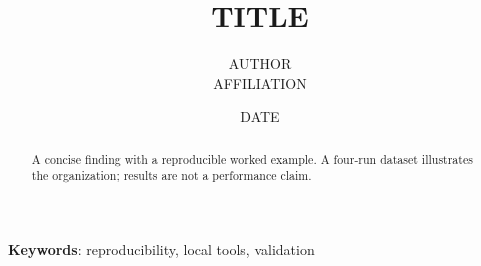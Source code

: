 \documentclass{article}
\title{{{TITLE}}}
\author{{{AUTHOR}} \\ {{AFFILIATION}}}
\date{{{DATE}}}
\begin{document}
\maketitle
\begin{abstract}A concise finding with a reproducible worked example. A four-run dataset illustrates the organization; results are not a performance claim.\end{abstract}
\textbf{Keywords}: reproducibility, local tools, validation





\end{document}
